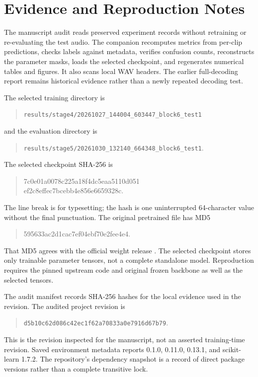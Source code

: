 \section{Evidence and Reproduction Notes}\label{app:evidence}
The manuscript audit reads preserved experiment records without retraining or re-evaluating the test audio. The companion  recomputes metrics from per-clip predictions, checks labels against metadata, verifies confusion counts, reconstructs the parameter masks, loads the selected checkpoint, and regenerates numerical tables and figures. It also scans local WAV headers. The earlier full-decoding report remains historical evidence rather than a newly repeated decoding test.

The selected training directory is
\begin{quote}\footnotesize
\nolinkurl{results/stage4/20261027_144004_603447_block6_test1}
\end{quote}
and the evaluation directory is
\begin{quote}\footnotesize
\nolinkurl{results/stage5/20261030_132140_664348_block6_test1}.
\end{quote}
The selected checkpoint SHA-256 is
\begin{quote}\footnotesize\ttfamily
7c0e01a0078c225a18f4dc5eaa5110d051\\
ef2c8effec7bcebb4e856e6659328c.
\end{quote}
The line break is for typesetting; the hash is one uninterrupted 64-character value without the final punctuation. The original pretrained file has MD5
\begin{quote}\footnotesize\ttfamily
595633ac2d1cac7ef04ebf70e2fee4e4.
\end{quote}
That MD5 agrees with the official weight release \cite{pannsweights}. The selected checkpoint stores only trainable parameter tensors, not a complete standalone model. Reproduction requires the pinned upstream code and original frozen backbone as well as the selected tensors.

The audit manifest records SHA-256 hashes for the local evidence used in the revision. The audited project revision is
\begin{quote}\footnotesize
\nolinkurl{d5b10c62d086c42ec1f62a70833a0e7916d67b79}.
\end{quote}
This is the revision inspected for the manuscript, not an asserted training-time revision. Saved environment metadata reports  0.1.0,  0.11.0,  0.13.1, and scikit-learn 1.7.2. The repository's dependency snapshot is a record of direct package versions rather than a complete transitive lock.

